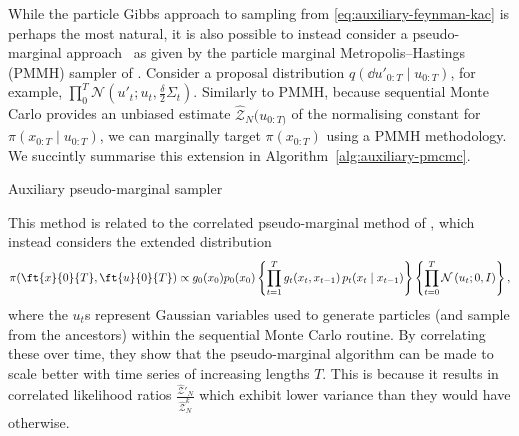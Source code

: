 While the particle Gibbs approach to sampling from \eqref{eq:auxiliary-feynman-kac} is perhaps the most natural, it is also possible to instead consider a pseudo-marginal approach~\citep{andrieu2009pseudomarginal} as given by the particle marginal Metropolis–Hastings (PMMH) sampler of \citet{Andrieu2010particle}. Consider a proposal distribution $q(\dd{u}'_{0:T} \mid u_{0:T})$, for example, $\prod_{0}^T \mathcal{N}(u'_t; u_t, \frac{\delta}{2}\Sigma_t)$. Similarly to PMMH, because sequential Monte Carlo provides an unbiased estimate $\hat{\mathcal{Z}}_N(u_{0:T)}$ of the normalising constant for $\pi(x_{0:T} \mid u_{0:T})$, we can marginally target $\pi(x_{0:T})$ using a PMMH methodology. We succintly summarise this extension in Algorithm~\ref{alg:auxiliary-pmcmc}.
\begin{algorithm}[!htb]
    \SetAlgoLined
    \DontPrintSemicolon
    \caption{Auxiliary pseudo-marginal sampler}\label{alg:auxiliary-pmcmc}
\end{algorithm}

This method is related to the correlated pseudo-marginal method of \citet{Deligiannidis2018correlated}, which instead considers the extended distribution
\begin{equation}
    \label{eq:other-auxiliary-feynman-kac}
    \pi(\ft{x}{0}{T}, \ft{u}{0}{T})
    \propto g_0(x_0) p_0(x_0) \left\{\prod_{t=1}^T g_t(x_t, x_{t-1}) \, p_t(x_t \mid x_{t-1}) \right\}\left\{\prod_{t=0}^T \mathcal{N}\left(u_t; 0, I\right)\right\},
\end{equation}
where the $u_t$s represent Gaussian variables used to generate particles (and sample from the ancestors) within the sequential Monte Carlo routine. By correlating these over time, they show that the pseudo-marginal algorithm can be made to scale better with time series of increasing lengths $T$. This is because it results in correlated likelihood ratios $\frac{\hat{\mathcal{Z}}'_N}{\hat{\mathcal{Z}}^k_N}$ which exhibit lower variance than they would have otherwise.

